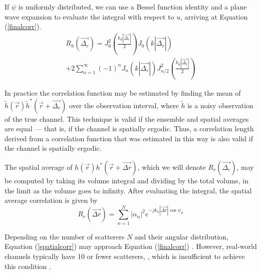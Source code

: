 \documentclass[conference]{ieeetran}
\begin{document}
If $\psi$ is uniformly distributed, we can use a Bessel function identity \cite{gradshteyn2007} and a plane wave expansion to evaluate the integral with respect to $u$, arriving at Equation (\ref{finalcorr}).
\begin{multline}\label{finalcorr}
R_h(\vec{\Delta_r}) = J_0^2(\frac{k_d |\vec{\Delta_r}|}{2})J_0(k|\vec{\Delta_r}|)\\ + 2\sum_{n=1}^{\infty}(-1)^n J_n(k|\vec{\Delta_r}|)J_{n/2}^2(\frac{k_d |\vec{\Delta_r}|}{2})
\end{multline}

In practice the correlation function may be estimated by finding the mean of $\tilde{h}(\vec{r})\tilde{h}^*(\vec{r}+\vec{\Delta_r})$ over the observation interval, where $\tilde{h}$ is a noisy observation of the true channel. This technique is valid if the ensemble and spatial averages are equal --- that is, if the channel is spatially ergodic.  Thus, a correlation length derived from a correlation function that was estimated in this way is also valid if the channel is spatially ergodic.

The spatial average of $h(\vec{r})h^*(\vec{r}+\vec{\Delta r})$, which we will denote $R_r(\vec{\Delta_r})$, may be computed by taking its volume integral and dividing by the total volume, in the limit as the volume goes to infinity.
After evaluating the integral, the spatial average correlation is given by 
\begin{equation}\label{spatialcorr}
R_r(\vec{\Delta r}) =  \sum_{n=1}^N |\alpha_n|^2 e^{-jk_n|\vec{\Delta r}|\cos \psi_n}
\end{equation}

Depending on the number of scatterers $N$ and their angular distribution, Equation (\ref{spatialcorr}) may approach Equation (\ref{finalcorr}) \cite{isukapalli2006}.  However, real-world channels typically have 10 or fewer scatterers, \cite{duel-hallen2000}, which is insufficient to achieve this condition .  
\end{document}
